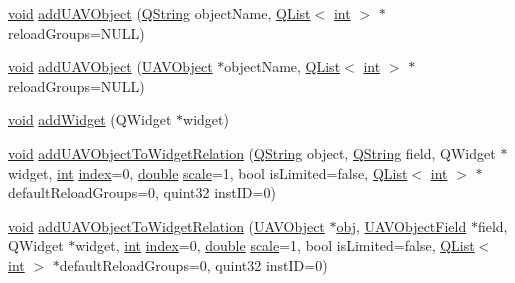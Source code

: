\begin{DoxyCompactItemize}
\hyperlink{group___u_a_v_objects_plugin_ga444cf2ff3f0ecbe028adce838d373f5c}{void} \hyperlink{group___u_a_v_object_widget_utils_ga82f371b1291826ec74341dddfe827c83}{add\-U\-A\-V\-Object} (\hyperlink{group___u_a_v_objects_plugin_gab9d252f49c333c94a72f97ce3105a32d}{Q\-String} object\-Name, \hyperlink{class_q_list}{Q\-List}$<$ \hyperlink{ioapi_8h_a787fa3cf048117ba7123753c1e74fcd6}{int} $>$ $\ast$reload\-Groups=N\-U\-L\-L)
\item 
\hyperlink{group___u_a_v_objects_plugin_ga444cf2ff3f0ecbe028adce838d373f5c}{void} \hyperlink{group___u_a_v_object_widget_utils_gac56e252ece21406583d59af2b70c2565}{add\-U\-A\-V\-Object} (\hyperlink{class_u_a_v_object}{U\-A\-V\-Object} $\ast$object\-Name, \hyperlink{class_q_list}{Q\-List}$<$ \hyperlink{ioapi_8h_a787fa3cf048117ba7123753c1e74fcd6}{int} $>$ $\ast$reload\-Groups=N\-U\-L\-L)
\item 
\hyperlink{group___u_a_v_objects_plugin_ga444cf2ff3f0ecbe028adce838d373f5c}{void} \hyperlink{group___u_a_v_object_widget_utils_ga3edd7677e362be586b059c066e0a4e30}{add\-Widget} (Q\-Widget $\ast$widget)
\item 
\hyperlink{group___u_a_v_objects_plugin_ga444cf2ff3f0ecbe028adce838d373f5c}{void} \hyperlink{group___u_a_v_object_widget_utils_ga8f5d01ae74d161f7b85d123e66c49451}{add\-U\-A\-V\-Object\-To\-Widget\-Relation} (\hyperlink{group___u_a_v_objects_plugin_gab9d252f49c333c94a72f97ce3105a32d}{Q\-String} object, \hyperlink{group___u_a_v_objects_plugin_gab9d252f49c333c94a72f97ce3105a32d}{Q\-String} field, Q\-Widget $\ast$widget, \hyperlink{ioapi_8h_a787fa3cf048117ba7123753c1e74fcd6}{int} \hyperlink{glext_8h_ab47dd9958bcadea08866b42bf358e95e}{index}=0, \hyperlink{_super_l_u_support_8h_a8956b2b9f49bf918deed98379d159ca7}{double} \hyperlink{glext_8h_a281421b881aa7a1266842b73a3bc7655}{scale}=1, bool is\-Limited=false, \hyperlink{class_q_list}{Q\-List}$<$ \hyperlink{ioapi_8h_a787fa3cf048117ba7123753c1e74fcd6}{int} $>$ $\ast$default\-Reload\-Groups=0, quint32 inst\-I\-D=0)
\item 
\hyperlink{group___u_a_v_objects_plugin_ga444cf2ff3f0ecbe028adce838d373f5c}{void} \hyperlink{group___u_a_v_object_widget_utils_ga9516761ea1de60250535bdebc9dd7fa9}{add\-U\-A\-V\-Object\-To\-Widget\-Relation} (\hyperlink{class_u_a_v_object}{U\-A\-V\-Object} $\ast$\hyperlink{glext_8h_a0c0d4701a6c89f4f7f0640715d27ab26}{obj}, \hyperlink{class_u_a_v_object_field}{U\-A\-V\-Object\-Field} $\ast$field, Q\-Widget $\ast$widget, \hyperlink{ioapi_8h_a787fa3cf048117ba7123753c1e74fcd6}{int} \hyperlink{glext_8h_ab47dd9958bcadea08866b42bf358e95e}{index}=0, \hyperlink{_super_l_u_support_8h_a8956b2b9f49bf918deed98379d159ca7}{double} \hyperlink{glext_8h_a281421b881aa7a1266842b73a3bc7655}{scale}=1, bool is\-Limited=false, \hyperlink{class_q_list}{Q\-List}$<$ \hyperlink{ioapi_8h_a787fa3cf048117ba7123753c1e74fcd6}{int} $>$ $\ast$default\-Reload\-Groups=0, quint32 inst\-I\-D=0)

\end{DoxyCompactItemize}
